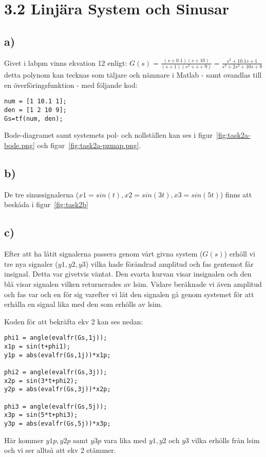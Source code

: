 \section*{3.2 Linjära System och Sinusar}
\subsection*{a)}
Givet i labpm vinns ekvation 12 enligt: 
$G(s) = \frac{(s+0.1)(s+10)}{(s+1)(s^2+s+9)} =
\frac{s^2+10.1s+1}{s^3+2s^2+10s+9}$
detta polynom kan tecknas som täljare och nämnare i Matlab - samt ovandlas till
en överföringsfunktion - med följande kod:

\begin{lstlisting}
num = [1 10.1 1];
den = [1 2 10 9];
Gs=tf(num, den);
\end{lstlisting}

Bode-diagramet samt systemets pol- och nollställen kan ses i
figur~\ref{fig:task2a-bode.png} och figur~\ref{fig:task2a-pzmap.png}.

\subsection*{b)}
De tre sinussignalerna ($x1 = sin(t), x2 = sin(3t), x3 = sin(5t)$) finns att
beskåda i figur~\ref{fig:task2b}

\subsection*{c)}
Efter att ha låtit signalerna passera genom vårt givna system ($G(s)$) erhöll
vi tre nya signaler ($y1, y2, y3$) vilka hade förändrad amplitud och fas
gentemot får insignal. Detta var givetvis väntat. Den svarta kurvan visar
insignalen och den blå visar signalen vilken returnerades av lsim. Vidare
beräknade vi även amplitud och fas var och en för sig varefter vi lät den
signalen gå genom systemet för att erhålla en signal lika med den som erhölls
av lsim.

Koden för att bekräfta ekv 2 kan ses nedan:

\begin{lstlisting}
phi1 = angle(evalfr(Gs,1j));
x1p = sin(t+phi1);
y1p = abs(evalfr(Gs,1j))*x1p;

phi2 = angle(evalfr(Gs,3j));
x2p = sin(3*t+phi2);
y2p = abs(evalfr(Gs,3j))*x2p;

phi3 = angle(evalfr(Gs,5j));
x3p = sin(5*t+phi3);
y3p = abs(evalfr(Gs,5j))*x3p;
\end{lstlisting}

Här kommer $y1p, y2p \text{ samt } y3p$ vara lika med $y1, y2 \text{ och } y3$
vilka erhölls från lsim och vi ser alltså att ekv 2 stämmer.
